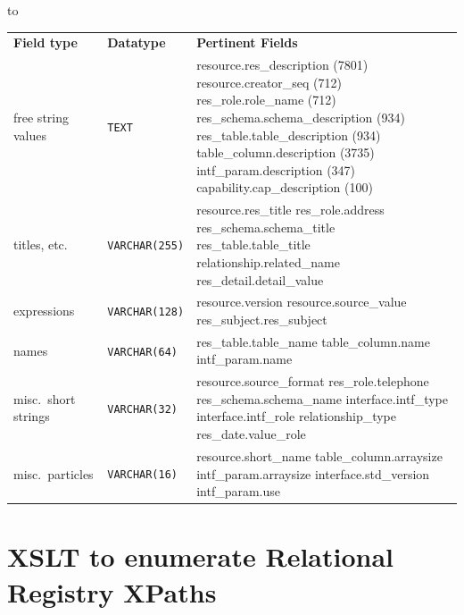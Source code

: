\documentclass[11pt,a4paper]{ivoa}
\newcommand{\sptablerule}{\noalign{\vspace{2pt}}\hline\noalign{\vspace{2pt}}}
\newenvironment{inlinetable}{\vfil\penalty8000\vfilneg%
    \hbox to\hsize\bgroup\hss}
  {\hss\egroup\vspace{8pt}}
\begin{document}
\begin{inlinetable}
\begin{tabular}{llp{6cm}}
\sptablerule
\textbf{Field type}&
\textbf{Datatype}&
\textbf{Pertinent Fields}\\
\sptablerule
free string values&\texttt{TEXT}&resource.res\_description
(7801)\hfil\break
          resource.creator\_seq (712)\hfil\break
          res\_role.role\_name (712)\hfil\break
          res\_schema.schema\_description (934)\hfil\break
          res\_table.table\_description (934)\hfil\break
          table\_column.description (3735)\hfil\break
          intf\_param.description (347)\hfil\break
          capability.cap\_description (100)\\
\sptablerule
titles, etc.&\texttt{VARCHAR(255)}&resource.res\_title\hfil\break
          res\_role.address\hfil\break
          res\_schema.schema\_title\hfil\break
          res\_table.table\_title\hfil\break
          relationship.related\_name\hfil\break
          res\_detail.detail\_value\\
\sptablerule
expressions&\texttt{VARCHAR(128)}&resource.version\hfil\break
          resource.source\_value\hfil\break
          res\_subject.res\_subject\\
\sptablerule
names&\texttt{VARCHAR(64)}&res\_table.table\_name\hfil\break
          table\_column.name\hfil\break
          intf\_param.name\\
\sptablerule
misc.~short strings&\texttt{VARCHAR(32)}&resource.source\_format\hfil\break
          res\_role.telephone\hfil\break
          res\_schema.schema\_name\hfil\break
          interface.intf\_type\hfil\break
          interface.intf\_role\hfil\break
          relationship\_type\hfil\break
          res\_date.value\_role\\
\sptablerule
misc.~particles&\texttt{VARCHAR(16)}&resource.short\_name\hfil\break
          table\_column.arraysize\hfil\break
          intf\_param.arraysize\hfil\break
          interface.std\_version\hfil\break
          intf\_param.use\\
\end{tabular}
\end{inlinetable}



\section{XSLT to enumerate Relational
Registry XPaths}
\end{document}
